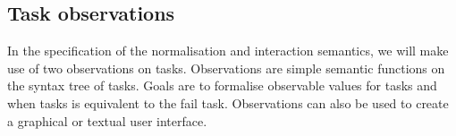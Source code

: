 




\subsection{Task observations}

In the specification of the normalisation and interaction semantics, we will make use of two observations on tasks.
Observations are simple semantic functions on the syntax tree of tasks.
Goals are to formalise observable values for tasks and when tasks is equivalent to the fail task.
Observations can also be used to create a graphical or textual user interface.





